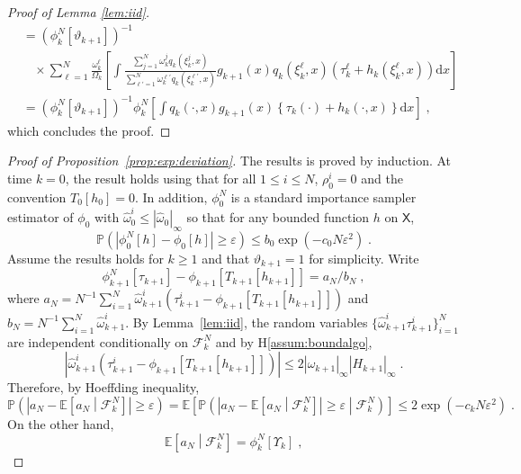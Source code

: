 \documentclass[12pt]{article}
\newcommand{\rmd}{\mathrm{d}}
\newcommand{\eqsp}{\;}
\newcommand{\1}{\mathrm{1}}
\newcommand{\qk}{q_{k}}
\begin{document}
\begin{proof}[Proof of Lemma \ref{lem:iid}]
\begin{align*}
&= \left(\phi^N_{k}[\vartheta_{k+1}]\right)^{-1}\\
&~~~~\times\sum_{\ell=1}^N \frac{\omega_k^\ell}{\Omega_k}\left[\int \frac{ \sum_{j=1}^N \omega_k^j\qk(\xi_k^j,x) }{ \sum_{\ell'=1}^N\omega_k^{\ell'}\qk(\xi_{k}^{\ell'},x) } g_{k+1}(x)\qk (\xi_{k}^{\ell},x)\left(\tau^{\ell}_k + h_{k}(\xi_{k}^{\ell},x)\right) \rmd x \right]\\ 
& =\left(\phi^N_{k}[\vartheta_{k+1}]\right)^{-1}\phi^N_{k}\left[\int \qk(\cdot,x)g_{k+1}(x)\left\{\tau_k(\cdot) + h_{k}(\cdot,x)\right\}\rmd x\right]\eqsp,
\end{align*}
which concludes the proof.
\end{proof}


\begin{proof}[Proof of Proposition~\ref{prop:exp:deviation}]
The results is proved by induction. At time $k=0$, the result holds using that for all $1\le i \le N$, $\rho_0^i = 0$ and the convention $T_0[h_0] =0$. In addition, $\phi_0^N$ is a standard importance sampler estimator of $\phi_0$ with $\widehat \omega_0^i\le |\widehat{\omega}_0|_{\infty}$ so that for any bounded function $h$ on $\mathsf{X}$,
\[
\mathbb{P}\left(\left|\phi_0^N[h] - \phi_0\left[h\right]\right|\ge \varepsilon\right)\le b_0\exp\left(-c_0N\varepsilon^2\right)\eqsp.
\]
Assume the results holds for $k\ge 1$ and that $\vartheta_{k+1} = 1$ for simplicity. Write
\[
\phi_{k+1}^N[\tau_{k+1}] - \phi_{k+1}\left[T_{k+1}[h_{k+1}]\right] = a_N/b_N\eqsp,
\]
where $a_N = N^{-1}\sum_{i=1}^N \widehat{\omega}_{k+1}^i \left(\tau_{k+1}^i - \phi_{k+1}\left[T_{k+1}[h_{k+1}]\right]\right)$ and $b_N =N^{-1}\sum_{i=1}^N \widehat{\omega}_{k+1}^i$. By Lemma~\ref{lem:iid}, the random variables $\{\widehat{\omega}_{k+1}^i\tau_{k+1}^i\}_{i=1}^N$ are independent conditionally on $\mathcal{F}_k^{N}$ and by H\ref{assum:boundalgo},
\[
\left|\widehat{\omega}_{k+1}^i \left(\tau_{k+1}^i - \phi_{k+1}\left[T_{k+1}[h_{k+1}]\right]\right)\right| \le 2|\widehat{\omega}_{k+1}|_{\infty}|H_{k+1}|_{\infty}\eqsp.
\]
Therefore, by Hoeffding inequality,
\[
\mathbb{P}\left(\left|a_N - \mathbb{E}\left[a_N\middle|\mathcal{F}_k^{N}\right]\right|\ge \varepsilon\right) = \mathbb{E}\left[\mathbb{P}\left(\left|a_N - \mathbb{E}\left[a_N\middle|\mathcal{F}_k^{N}\right]\right|\ge \varepsilon\middle|\mathcal{F}_k^{N}\right)\right]\le 2\exp\left(-c_kN\varepsilon^2\right)\eqsp.
\] 
On the other hand,
\[
\mathbb{E}\left[a_N\middle|\mathcal{F}_k^{N}\right] = \phi^N_{k}\left[\Upsilon_k\right] \eqsp,
\]
\end{proof}
\end{document}
